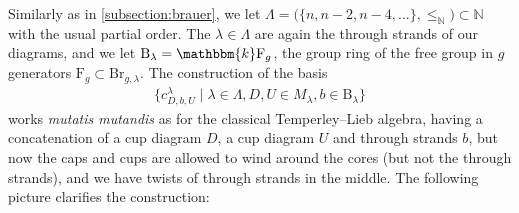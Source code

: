 \documentclass[a4paper,11pt]{amsart}
\newcommand{\muta}{\textsl{mutatis mutandis}}
\renewcommand{\dots}{\text{...}}
\newcommand{\setstuff}[1]{\mathrm{#1}}
\newcommand{\KK}{\mathbbm{k}}
\newcommand{\N}{\mathbb{N}}
\numberwithin{equation}{section}
\let\fullref\autoref
\begin{document}
Similarly as in \fullref{subsection:brauer}, 
we let $\Lambda=\big(\{n,n-2,n-4,\dots\},\leq_{\N}\big)\subset\N$ 
with the usual partial order.
The $\lambda\in\Lambda$ are again the through strands of our diagrams, 
and we let $\setstuff{B}_{\lambda}=\KK\setstuff{F}_{g}$, 
the group ring of the free group in $g$ 
generators $\setstuff{F}_{g}\subset\setstuff{Br}_{g,\lambda}$.
The construction of the basis 
\begin{gather}\label{eq:tl-basis}
\{c_{D,b,U}^{\lambda}\mid\lambda\in\Lambda,D,U\in M_{\lambda},
b\in\setstuff{B}_{\lambda}\}
\end{gather} 
works {\muta} as for the 
classical Temperley--Lieb algebra, having a concatenation 
of a cup diagram $D$, a cup diagram $U$ and through strands $b$, but now 
the caps and cups are allowed to wind around the cores 
(but not the through strands), 
and we have twists of through strands in the middle.
The following picture clarifies the construction:
\end{document}
